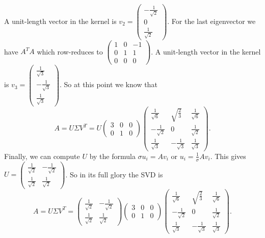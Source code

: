 \documentclass{exercise}
\begin{document}
	A unit-length vector in the kernel is \(v_2 = \begin{pmatrix}
		-\frac{1}{\sqrt{2}}\\
		0\\
		\frac{1}{\sqrt{2}}
	\end{pmatrix}\).
	For the last eigenvector we have \(A^T A\) which row-reduces to \(\begin{pmatrix}
		1 & 0 & -1\\
		0 & 1 & 1\\
		0 & 0 & 0
	\end{pmatrix}\). A unit-length vector in the kernel is \(v_3 = \begin{pmatrix}
		\frac{1}{\sqrt{3}}\\
		-\frac{1}{\sqrt{3}}\\
		\frac{1}{\sqrt{3}}
	\end{pmatrix}\).
	So at this point we know that
	\[
		A = U\Sigma V^T = U\begin{pmatrix}
			3 & 0 & 0\\
			0 & 1 & 0
		\end{pmatrix}\begin{pmatrix}
			\frac{1}{\sqrt{6}} & \sqrt{\frac{2}{3}} & \frac{1}{\sqrt{6}}\\
			-\frac{1}{\sqrt{2}} & 0 & \frac{1}{\sqrt{2}}\\
			\frac{1}{\sqrt{3}} & -\frac{1}{\sqrt{3}} & \frac{1}{\sqrt{3}}
		\end{pmatrix}.
	\]
	Finally, we can compute \(U\) by the formula \(\sigma u_i = A v_i\) or \(u_i = \frac{1}{\sigma}Av_i\).
	This gives \(U = \begin{pmatrix}
		\frac{1}{\sqrt{2}} & -\frac{1}{\sqrt{2}}\\
		\frac{1}{\sqrt{2}} & \frac{1}{\sqrt{2}}
	\end{pmatrix}\).
	So in its full glory the SVD is
	\[
		A = U\Sigma V^T = \begin{pmatrix}
			\frac{1}{\sqrt{2}} & -\frac{1}{\sqrt{2}}\\
			\frac{1}{\sqrt{2}} & \frac{1}{\sqrt{2}}
		\end{pmatrix}\begin{pmatrix}
			3 & 0 & 0\\
			0 & 1 & 0
		\end{pmatrix}\begin{pmatrix}
			\frac{1}{\sqrt{6}} & \sqrt{\frac{2}{3}} & \frac{1}{\sqrt{6}}\\
			-\frac{1}{\sqrt{2}} & 0 & \frac{1}{\sqrt{2}}\\
			\frac{1}{\sqrt{3}} & -\frac{1}{\sqrt{3}} & \frac{1}{\sqrt{3}}
		\end{pmatrix}.
	\]
\end{document}
